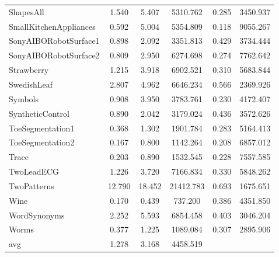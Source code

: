 \begin{table}[ht]
\begin{adjustbox}{width=0.7\textwidth,center}
\begin{tabular}{lccccc}
ShapesAll & 1.540 & 5.407 & 5310.762 & 0.285 & 3450.937 \\
SmallKitchenAppliances & 0.592 & 5.004 & 5354.809 & 0.118 & 9055.267 \\
SonyAIBORobotSurface1 & 0.898 & 2.092 & 3351.813 & 0.429 & 3734.444 \\
SonyAIBORobotSurface2 & 0.809 & 2.950 & 6274.698 & 0.274 & 7762.642 \\
Strawberry & 1.215 & 3.918 & 6902.521 & 0.310 & 5683.844 \\
SwedishLeaf & 2.807 & 4.962 & 6646.234 & 0.566 & 2369.926 \\
Symbols & 0.908 & 3.950 & 3783.761 & 0.230 & 4172.407 \\
SyntheticControl & 0.890 & 2.042 & 3179.024 & 0.436 & 3572.626 \\
ToeSegmentation1 & 0.368 & 1.302 & 1901.784 & 0.283 & 5164.413 \\
ToeSegmentation2 & 0.167 & 0.800 & 1142.264 & 0.208 & 6857.012 \\
Trace & 0.203 & 0.890 & 1532.545 & 0.228 & 7557.585 \\
TwoLeadECG & 1.226 & 3.720 & 7166.834 & 0.330 & 5848.262 \\
TwoPatterns & 12.790 & 18.452 & 21412.783 & 0.693 & 1675.651 \\
Wine & 0.170 & 0.439 & 737.200 & 0.386 & 4351.850 \\
WordSynonyms & 2.252 & 5.593 & 6854.458 & 0.403 & 3046.204 \\
Worms & 0.377 & 1.225 & 1089.084 & 0.307 & 2895.906 \\
\hline 
avg & 1.278 & 3.168 & 4458.519 \\ 
\hline
\end{tabular}
\end{adjustbox}
\end{table}



